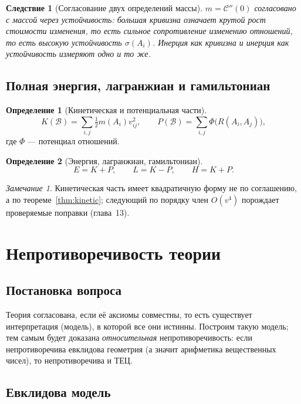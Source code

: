 \documentclass[12pt,a4paper,oneside]{book}
\theoremstyle{definition}
\newtheorem{definition}{Определение}[chapter]
\theoremstyle{plain}
\newtheorem{corollary}{Следствие}[chapter]
\theoremstyle{remark}
\newtheorem{remark}{Замечание}[chapter]
\newcommand{\SubParts}{\mathcal B}
\newcommand{\Rel}{R}
\newcommand{\Stab}{\sigma}
\newcommand{\Cost}{\mathcal C}
\begin{document}
\begin{corollary}[Согласование двух определений массы]
$m=\Cost''(0)$ согласовано с массой через устойчивость: большая кривизна означает
крутой рост стоимости изменения, то есть сильное сопротивление изменению отношений,
то есть высокую устойчивость $\Stab(A_i)$. Инерция как кривизна и инерция как
устойчивость измеряют одно и то же.
\end{corollary}

\section{Полная энергия, лагранжиан и гамильтониан}

\begin{definition}[Кинетическая и потенциальная части]
\[
K(\SubParts)=\sum_{i,j}\tfrac12 m(A_i)v_{ij}^2,\qquad
P(\SubParts)=\sum_{i,j}\Phi\bigl(\Rel(A_i,A_j)\bigr),
\]
где $\Phi$ --- потенциал отношений.
\end{definition}

\begin{definition}[Энергия, лагранжиан, гамильтониан]
\[
E=K+P,\qquad L=K-P,\qquad H=K+P.
\]
\end{definition}

\begin{remark}
Кинетическая часть имеет квадратичную форму не по соглашению, а по
теореме~\ref{thm:kinetic}; следующий по порядку член $O(v^4)$ порождает проверяемые
поправки (глава~13).
\end{remark}

\chapter{Непротиворечивость теории}

\section{Постановка вопроса}

Теория согласована, если её аксиомы совместны, то есть существует интерпретация
(модель), в которой все они истинны. Построим такую модель; тем самым будет доказана
\emph{относительная} непротиворечивость: если непротиворечива евклидова геометрия
(а значит арифметика вещественных чисел), то непротиворечива и ТЕЦ.

\section{Евклидова модель}
\end{document}
